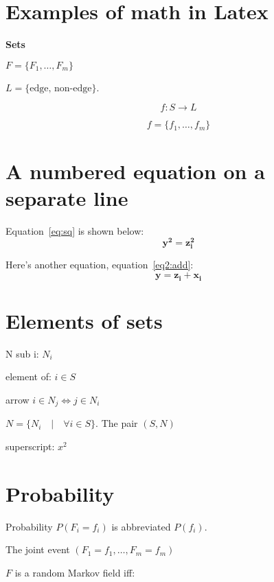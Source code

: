 \documentclass{article}
\begin{document}
 

\section{Examples of math in Latex} 

\textbf{Sets}


$F=\{F_1,\ldots,F_m\}$

$L=\{\text{edge, non-edge}\}$.

$$f:S \rightarrow L$$

$$f=\{f_1,\ldots,f_m\}$$

\section{A numbered equation on a separate line}

Equation~\ref{eq:sq} is shown below:
\begin{equation}
\mathbf{y^{2}=z_{i}^2} \label{eq:sq}
\end{equation}

Here's another equation, equation~\ref{eq2:add}:
\begin{equation}
\mathbf{y=z_{i}+x_{i}} \label{eq2:add}
\end{equation}

\section{Elements of sets}

N sub i:
$N_i$ 

element of:
$i \in S$

arrow
$i \in N_j \Leftrightarrow j \in N_i$

$N= \{ N_i \quad | \quad \forall i \in S\}$. The pair $(S,N)$ 

superscript:
$x^{2}$

\section{Probability}

Probability  $P(F_i=f_i)$ is abbreviated $P(f_i)$.

The joint event $(F_1=f_1,\ldots,F_m=f_m)$

$F$ is a random Markov field iff:
\end{document}

